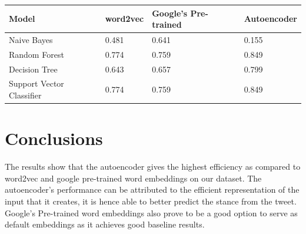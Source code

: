\documentclass[a0,portrait]{a0poster}
\begin{document}
\begin{multicols}{2}
\begin{center}\vspace{1cm}
\begin{tabular}{l l l l} 
\toprule
\textbf{Model} & \textbf{word2vec} & \textbf{Google's Pre-trained} & \textbf{Autoencoder}\\
\midrule
Naive Bayes & 0.481 & 0.641 & 0.155 \\ 
Random Forest & 0.774 & 0.759 & 0.849 \\  
Decision Tree & 0.643  & 0.657 & 0.799 \\
Support Vector Classifier & 0.774  & 0.759 & 0.849 \\
\bottomrule
\end{tabular}
\end{center}

\color{SaddleBrown} %

\section*{Conclusions}

The results show that the autoencoder gives the highest efficiency as compared to word2vec and google pre-trained word embeddings on our dataset. The autoencoder's performance can be attributed to the efficient representation of the input that it creates, it is hence able to better predict the stance from the tweet. Google's Pre-trained word embeddings also prove to be a good option to serve as default embeddings as it achieves good baseline results.

\color{DarkSlateGray} %





\end{multicols}
\end{document}
